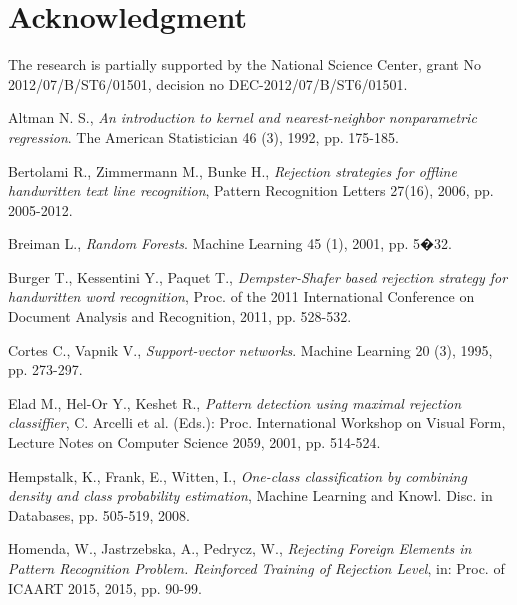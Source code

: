\documentclass{llncs}
\begin{document}
\section*{Acknowledgment}

\noindent The research is partially supported  by the National Science Center, grant No 2012/07/B/ST6/01501, decision no \mbox{DEC-2012/07/B/ST6/01501}.


\begin{thebibliography}{1}

Altman N. S., \emph{An introduction to kernel and nearest-neighbor nonparametric regression}. The American Statistician 46 (3), 1992, pp. 175-185.

Bertolami R., Zimmermann M., Bunke H., \emph{Rejection strategies for offline handwritten text line recognition}, Pattern Recognition Letters 27(16), 2006, pp. 2005-2012.

Breiman L., \emph{Random Forests}. Machine Learning 45 (1), 2001, pp. 5�32. 

Burger T., Kessentini Y., Paquet T., \emph{Dempster-Shafer based rejection strategy for handwritten word recognition}, Proc. of the 2011 International Conference on Document Analysis and Recognition, 2011, pp. 528-532.

Cortes C., Vapnik V., \emph{Support-vector networks}. Machine Learning 20 (3), 1995, pp. 273-297.
 
Elad M., Hel-Or Y., Keshet R., \emph{Pattern detection using maximal rejection classiffier}, C. Arcelli et al. (Eds.): Proc. International Workshop on Visual Form, Lecture Notes on Computer Science 2059, 2001, pp. 514-524.
 
Hempstalk, K., Frank, E., Witten, I., \emph{One-class classification by combining density and class probability estimation}, Machine Learning and Knowl. Disc. in Databases, pp. 505-519, 2008.

Homenda, W., Jastrzebska, A., Pedrycz, W., \emph{Rejecting Foreign Elements in Pattern Recognition Problem. Reinforced Training of Rejection Level}, in: Proc. of ICAART 2015, 2015, pp. 90-99.


\end{thebibliography}
\end{document}

